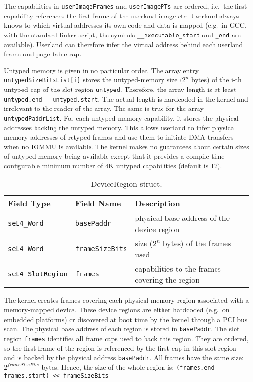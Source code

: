 The capabilities in \texttt{userImageFrames} and \texttt{userImagePTs} are
ordered, i.e.\ the first capability references the first frame of the
userland image etc. Userland always knows to which virtual addresses its own
code and data is mapped (e.g.\ in GCC, with the standard linker script, the
symbols \texttt{\_\_executable\_start} and \texttt{\_end} are available).
Userland can therefore
infer the virtual address behind each userland frame and page-table cap.

Untyped memory is given in no particular order. The array entry
\texttt{untypedSizeBitsList[i]} stores the untyped-memory size ($2^n$ bytes) of
the i-th untyped cap of the slot region \texttt{untyped}. Therefore, the array
length is at least \texttt{untyped.end - untyped.start}. The actual length is
hardcoded in the kernel and irrelevant to the reader of the array.
The same is true for the array \texttt{untypedPaddrList}. For each
untyped-memory capability, it stores the physical addresses backing the
untyped memory. This allows
userland to infer physical memory addresses of retyped frames and use them to
initiate DMA transfers when no IOMMU is available. The kernel makes no
guarantees about certain sizes of untyped memory being available except that it
provides a compile-time-configurable minimum number of 4K untyped capabilities
(default is 12).

\begin{table}[htb]
  \begin{center}
    \caption{DeviceRegion struct.}
    \label{tab:device_region_struct}
    \begin{tabular}{lll}
      \toprule
      Field Type & Field Name & Description \\
      \midrule
      \texttt{seL4\_Word}       & \texttt{basePaddr}     & physical base address of the device region \\
      \texttt{seL4\_Word}       & \texttt{frameSizeBits} & size ($2^n$ bytes) of the frames used \\
      \texttt{seL4\_SlotRegion} & \texttt{frames}        & capabilities to the frames covering the region \\
      \bottomrule
    \end{tabular}
  \end{center}
\end{table}

The kernel creates frames covering each physical memory region associated with
a memory-mapped device. These device regions are either hardcoded (e.g.\ on
embedded platforms) or discovered at boot time by the kernel through a PCI bus
scan. The physical base address of each region is stored in \texttt{basePaddr}.
The slot region \texttt{frames} identifies all frame caps used to back this
region. They are ordered, so the first frame of the region is referenced by the
first cap in this slot region and is backed by the physical address
\texttt{basePaddr}. All frames have the same size: $2^{frameSizeBits}$ bytes.
Hence, the size of the whole region is:
\texttt{(frames.end - frames.start) << frameSizeBits}

